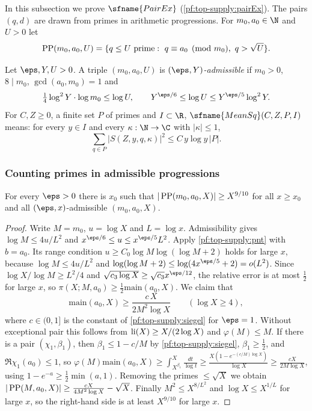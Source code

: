 In this subsection we prove $\sfname{PairEx}$ (\cref{pf:top-supply:pairEx}). The pairs $(q,d)$ are drawn from
primes in arithmetic progressions. For $m_0,a_0\in\N$ and $U>0$ let
\[
\topsupplyPP(m_0,a_0,U)=\{q\le U\ \text{prime}:\ q\equiv a_0\pmod{m_0},\ q>\sqrt U\}.
\]

\begin{definition}\label{pf:top-supply:admitted}
Let $\eps,Y,U>0$. A triple $(m_0,a_0,U)$ is \emph{$(\eps,Y)$-admissible} if $m_0>0$, $8\mid m_0$, $\gcd(a_0,m_0)=1$ and
\[
\tfrac14\log^2Y\cdot\log m_0\le\log U,\qquad Y^{\eps/6}\le\log U\le Y^{\eps/5}\log^2Y.
\]
For $C,Z\ge0$, a finite set $P$ of primes and $I\subset\R$, $\sfname{MeanSq}(C,Z,P,I)$ means: for every $y\in I$ and
every $\kappa:\N\to\C$ with $|\kappa|\le1$,
\[
\sum_{q\in P}|S(Z,y,q,\kappa)|^2\le C\,y\log y\,|P|.
\]
  
\end{definition}

\subsubsection{Counting primes in admissible progressions}

\begin{lemma}\label{pf:top-supply:counta}
For every $\eps>0$ there is $x_0$ such that $|\operatorname{PP}(m_0,a_0,X)|\ge X^{9/10}$ for all $x\ge x_0$ and all
$(\eps,x)$-admissible $(m_0,a_0,X)$.
\end{lemma}

\begin{proof}
Write $M=m_0$, $u=\log X$ and $L=\log x$. Admissibility gives $\log M\le4u/L^2$ and $x^{\eps/6}\le u\le x^{\eps/5}L^2$.
Apply \cref{pf:top-supply:pnt} with $b=a_0$. Its range condition $u\ge C_0\log M\log(\log M+2)$ holds for large $x$,
because $\log M\le4u/L^2$ and $\log(\log M+2)\le\log(4x^{\eps/5}+2)=o(L^2)$. Since
$\log X/\log M\ge L^2/4$ and $\sqrt{c_3\log X}\ge\sqrt{c_3}x^{\eps/12}$, the relative error is at most $\frac12$ for
large $x$, so $\pi(X;M,a_0)\ge\frac12\mathrm{main}(a_0,X)$. We claim that
\[
\mathrm{main}(a_0,X)\ge\frac{c\,X}{2M^2\log X}\qquad(\log X\ge4),
\]
where $c\in(0,1]$ is the constant of \cref{pf:top-supply:siegel} for $\eps=1$. Without exceptional pair this follows from
$\operatorname{li}(X)\ge X/(2\log X)$ and $\varphi(M)\le M$. If there is a pair $(\chi_1,\beta_1)$, then $\beta_1\le1-c/M$ by
\cref{pf:top-supply:siegel}, $\beta_1\ge\frac12$, and $\Re\chi_1(a_0)\le1$, so
$\varphi(M)\mathrm{main}(a_0,X)\ge\int_{X^{\beta_1}}^X\frac{dt}{\log t}\ge\frac{X(1-e^{-(c/M)\log X})}{\log X}\ge\frac{cX}{2M\log X}$,
using $1-e^{-a}\ge\frac12\min(a,1)$. Removing the primes $\le\sqrt X$ we obtain
$|\operatorname{PP}(M,a_0,X)|\ge\frac{cX}{4M^2\log X}-\sqrt X$. Finally $M^2\le X^{8/L^2}$ and $\log X\le X^{1/L}$ for large
$x$, so the right-hand side is at least $X^{9/10}$ for large $x$.
\end{proof}

